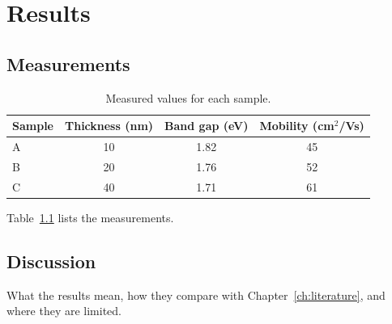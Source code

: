 \chapter{Results}
\label{ch:results}

\section{Measurements}

\begin{table}[htbp]
  \centering
  \caption{Measured values for each sample.}
  \label{tab:measurements}
  \begin{tabular}{lccc}
    \toprule
    Sample & Thickness (nm) & Band gap (eV) & Mobility (cm$^{2}$/Vs) \\
    \midrule
    A & 10 & 1.82 & 45 \\
    B & 20 & 1.76 & 52 \\
    C & 40 & 1.71 & 61 \\
    \bottomrule
  \end{tabular}
\end{table}

Table~\ref{tab:measurements} lists the measurements.

\section{Discussion}
What the results mean, how they compare with Chapter~\ref{ch:literature},
and where they are limited.
